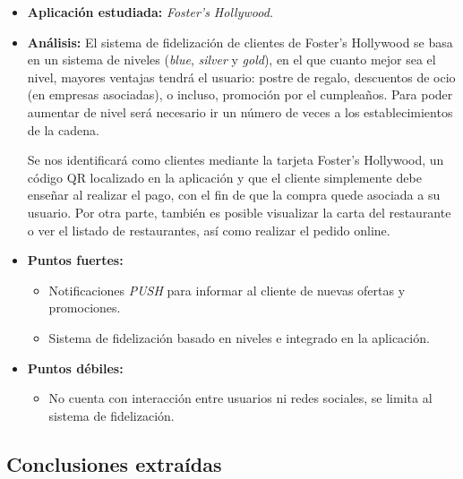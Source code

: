 \documentclass[twoside]{report}
\begin{document}
\begin{itemize}
\item \textbf{Aplicación estudiada:} \cite{fostersh} \textit{Foster's Hollywood.}
\item \textbf{Análisis:} 
El sistema de fidelización de clientes de Foster's Hollywood se basa en un sistema de niveles (\textit{blue}, \textit{silver} y \textit{gold}), en el que cuanto mejor sea el nivel, mayores ventajas tendrá el usuario: postre de regalo, descuentos de ocio (en empresas asociadas), o incluso, promoción por el cumpleaños. Para poder aumentar de nivel será necesario ir un número de veces a los establecimientos de la cadena. 

Se nos identificará como clientes mediante la tarjeta Foster's Hollywood, un código QR localizado en la aplicación y que el cliente simplemente debe enseñar al realizar el pago, con el fin de que la compra quede asociada a su usuario. Por otra parte, también es posible visualizar la carta del restaurante o ver el listado de restaurantes, así como realizar el pedido online.
\item \textbf{Puntos fuertes:}
	\begin{itemize}
	\item Notificaciones \textit{PUSH} para informar al cliente de nuevas ofertas y promociones.
	\item Sistema de fidelización basado en niveles e integrado en la aplicación.
	\end{itemize}
\item \textbf{Puntos débiles:}
	\begin{itemize}
	\item No cuenta con interacción entre usuarios ni redes sociales, se limita al sistema de fidelización.
	\end{itemize}
\end{itemize}

\subsection{Conclusiones extraídas}
\end{document}
